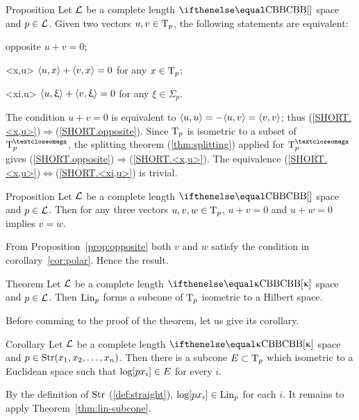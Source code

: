 \begin{thm}{Proposition}\label{prop:opposite}
Let $\mathcal{L}$ be a complete length $\Alex{}$ space and $p\in \spc{L}$.
Given two vectors $u,v\in\T_p$, the following statements are equivalent:
\begin{subthm}{opposite} $u+v=0$;
\end{subthm}
\begin{subthm}{<x,u>} $\langle u,x\rangle+\langle v,x\rangle=0$ for any $x\in\T_p$;
\end{subthm}
\begin{subthm}{<xi,u>} $\langle u,\upxi\rangle+\langle v,\upxi\rangle=0$ for any $\xi\in\Sigma_p$.
\end{subthm}
\end{thm}

The condition $u+v=0$ is equivalent to $\langle u,u\rangle=-\langle u,v\rangle=\langle v,v\rangle$;
thus 
(\ref{SHORT.<x,u>})$\Rightarrow$(\ref{SHORT.opposite}).
Since $\text{\rm T}_p$ is isometric to a subset of $\T^\o_p$,
the splitting theorem (\ref{thm:splitting}) applied for $\T_p^\o$
gives (\ref{SHORT.opposite})$\Rightarrow$(\ref{SHORT.<x,u>}).
The equivalence  (\ref{SHORT.<x,u>})$\Leftrightarrow$(\ref{SHORT.<xi,u>}) is trivial.
\qeds

\begin{thm}{Proposition}\label{prop:two-opp}
Let $\mathcal{L}$  be a complete length $\Alex{}$ space and $p\in \spc{L}$.
Then for any three vectors $u,v,w\in\T_p$, $u+v=0$ and $u+ w=0$ implies $v=w$.
\end{thm}

 From Proposition~\ref{prop:opposite} both $v$ and $w$ satisfy the condition in corollary~\ref{cor:polar}. 
Hence the result.\qeds


\begin{thm}{Theorem}\label{thm:lin-subcone}
Let $\mathcal{L}$  be a complete length $\Alex{\kappa}$ space and $p\in \spc{L}$. 
Then $\mathop{\rm Lin}\nolimits_p$ forms a subcone of $\text{\rm T}_p$ isometric to a Hilbert space.
\end{thm}

Before comming to the proof of the theorem, 
let us give its corollary.

\begin{thm}{Corollary}\label{cor:euclid-subcone}
Let $\mathcal{L}$  be a complete length $\Alex{\kappa}$ space
and $p\in \Str(x_1,x_2,\dots,x_n)$.
Then there is a subcone $E\subset \T_p$ which isometric to a Euclidean space such that $\ddir p{x_i}\in E$ for every $i$.
\end{thm}

By the definition of $\mathop{\rm Str}\nolimits$ (\ref{def:straight}), $\ddir{p}{x_i}\in \Lin_p$ for each $i$.
It remains to apply Theorem~\ref{thm:lin-subcone}.
\qeds


